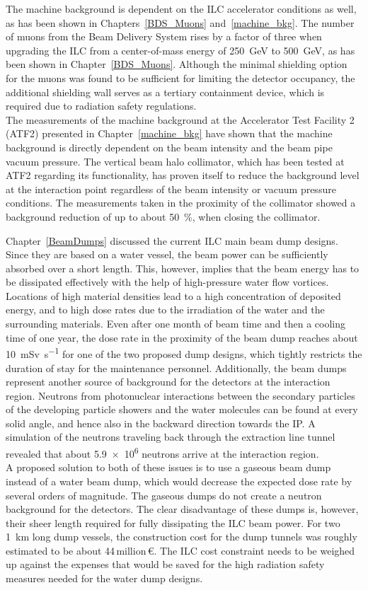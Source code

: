The machine background is dependent on the ILC accelerator conditions as well, as has been shown in Chapters~\ref{BDS_Muons} and~\ref{machine_bkg}.
The number of muons from the Beam Delivery System rises by a factor of three when upgrading the ILC from a center-of-mass energy of \SI{250}{\GeV} to \SI{500}{\GeV}, as has been shown in Chapter~\ref{BDS_Muons}.
Although the minimal shielding option for the muons was found to be sufficient for limiting the \sid detector occupancy, the additional shielding wall serves as a tertiary containment device, which is required due to radiation safety regulations.
\\The measurements of the machine background at the Accelerator Test Facility 2 (ATF2) presented in Chapter~\ref{machine_bkg} have shown that the machine background is directly dependent on the beam intensity and the beam pipe vacuum pressure.
The vertical beam halo collimator, which has been tested at ATF2 regarding its functionality, has proven itself to reduce the background level at the interaction point regardless of the beam intensity or vacuum pressure conditions.
The measurements taken in the proximity of the collimator showed a background reduction of up to about \SI{50}{\percent}, when closing the collimator.

Chapter~\ref{BeamDumps} discussed the current ILC main beam dump designs.
Since they are based on a water vessel, the beam power can be sufficiently absorbed over a short length.
This, however, implies that the beam energy has to be dissipated effectively with the help of high-pressure water flow vortices.
Locations of high material densities lead to a high concentration of deposited energy, and to high dose rates due to the irradiation of the water and the surrounding materials. 
Even after one month of beam time and then a cooling time of one year, the dose rate in the proximity of the beam dump reaches about \SI{10}{\milli\sievert\per\second} for one of the two proposed dump designs, which tightly restricts the duration of stay for the maintenance personnel.
Additionally, the beam dumps represent another source of background for the detectors at the interaction region.
Neutrons from photonuclear interactions between the secondary particles of the developing particle showers and the water molecules can be found at every solid angle, and hence also in the backward direction towards the IP.
A simulation of the neutrons traveling back through the extraction line tunnel revealed that about \num{5.9e6} neutrons arrive at the interaction region.
\\A proposed solution to both of these issues is to use a gaseous beam dump instead of a water beam dump, which would decrease the expected dose rate by several orders of magnitude.
The gaseous dumps do not create a neutron background for the detectors.
The clear disadvantage of these dumps is, however, their sheer length required for fully dissipating the ILC beam power.
For two \SI{1}{\kilo\meter} long dump vessels, the construction cost for the dump tunnels was roughly estimated to be about 44\,million\,\euro.
The ILC cost constraint needs to be weighed up against the expenses that would be saved for the high radiation safety measures needed for the water dump designs.

